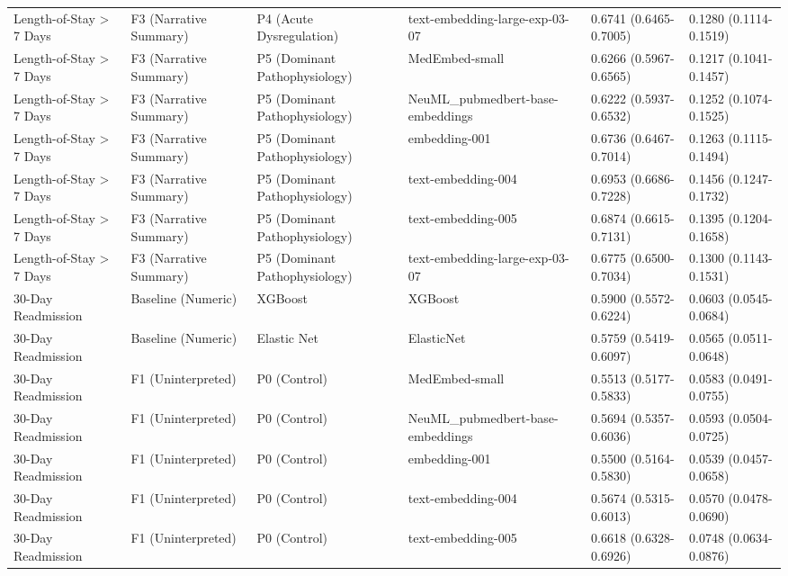 \documentclass[border=0pt]{standalone}
\begin{document}
\begin{adjustbox}{width=\textwidth}
\begin{tabular}{llllll}
Length-of-Stay \textgreater{} 7 Days & F3 (Narrative Summary) & P4 (Acute Dysregulation) & text-embedding-large-exp-03-07 & 0.6741 (0.6465-0.7005) & 0.1280 (0.1114-0.1519) \\
Length-of-Stay \textgreater{} 7 Days & F3 (Narrative Summary) & P5 (Dominant Pathophysiology) & MedEmbed-small & 0.6266 (0.5967-0.6565) & 0.1217 (0.1041-0.1457) \\
Length-of-Stay \textgreater{} 7 Days & F3 (Narrative Summary) & P5 (Dominant Pathophysiology) & NeuML\_pubmedbert-base-embeddings & 0.6222 (0.5937-0.6532) & 0.1252 (0.1074-0.1525) \\
Length-of-Stay \textgreater{} 7 Days & F3 (Narrative Summary) & P5 (Dominant Pathophysiology) & embedding-001 & 0.6736 (0.6467-0.7014) & 0.1263 (0.1115-0.1494) \\
Length-of-Stay \textgreater{} 7 Days & F3 (Narrative Summary) & P5 (Dominant Pathophysiology) & text-embedding-004 & 0.6953 (0.6686-0.7228) & 0.1456 (0.1247-0.1732) \\
Length-of-Stay \textgreater{} 7 Days & F3 (Narrative Summary) & P5 (Dominant Pathophysiology) & text-embedding-005 & 0.6874 (0.6615-0.7131) & 0.1395 (0.1204-0.1658) \\
Length-of-Stay \textgreater{} 7 Days & F3 (Narrative Summary) & P5 (Dominant Pathophysiology) & text-embedding-large-exp-03-07 & 0.6775 (0.6500-0.7034) & 0.1300 (0.1143-0.1531) \\
30-Day Readmission & Baseline (Numeric) & XGBoost & XGBoost & 0.5900 (0.5572-0.6224) & 0.0603 (0.0545-0.0684) \\
30-Day Readmission & Baseline (Numeric) & Elastic Net & ElasticNet & 0.5759 (0.5419-0.6097) & 0.0565 (0.0511-0.0648) \\
30-Day Readmission & F1 (Uninterpreted) & P0 (Control) & MedEmbed-small & 0.5513 (0.5177-0.5833) & 0.0583 (0.0491-0.0755) \\
30-Day Readmission & F1 (Uninterpreted) & P0 (Control) & NeuML\_pubmedbert-base-embeddings & 0.5694 (0.5357-0.6036) & 0.0593 (0.0504-0.0725) \\
30-Day Readmission & F1 (Uninterpreted) & P0 (Control) & embedding-001 & 0.5500 (0.5164-0.5830) & 0.0539 (0.0457-0.0658) \\
30-Day Readmission & F1 (Uninterpreted) & P0 (Control) & text-embedding-004 & 0.5674 (0.5315-0.6013) & 0.0570 (0.0478-0.0690) \\
30-Day Readmission & F1 (Uninterpreted) & P0 (Control) & text-embedding-005 & 0.6618 (0.6328-0.6926) & 0.0748 (0.0634-0.0876) \\

\end{tabular}
\end{adjustbox}
\end{document}

